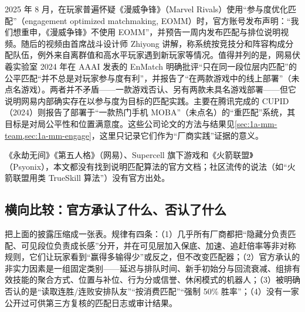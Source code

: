 2025 年 8 月，在玩家普遍怀疑《漫威争锋》（Marvel Rivals）使用“参与度优化匹配”（engagement optimized matchmaking, EOMM）时，官方账号发布声明：“我们想重申，《漫威争锋》不使用 EOMM”，并预告一周内发布匹配与排位说明视频\cite{insidergaming2025rivals}\tagOff。随后的视频由首席战斗设计师 Zhiyong 讲解，称系统按竞技分和阵容构成分配队伍，例外来自离群值和高水平玩家遇到新玩家等情况\cite{sportskeeda2025rivals}\tagCom{}。值得并列的是，网易伏羲实验室 2024 年在 AAAI 发表的 EnMatch 明确批评“只在同一段位层内匹配”的公平匹配“并不总是对玩家参与度有利”，并报告了“在两款游戏中的线上部署”（未点名游戏）\cite{wang2024enmatch}\tagLit。两者并不矛盾——一款游戏否认、另有两款未具名游戏部署——但它说明网易内部确实存在以参与度为目标的匹配实践。主要在腾讯完成的 CUPID（2024）则报告了部署于“一款热门手机 MOBA”（未点名）的“重匹配”系统，其目标是对局公平性和位置满意度\cite{fan2024cupid}\tagLit。这些公司论文的方法与结果见\cref{sec:1a-mm-team,sec:1a-mm-engage}，这里只记录它们作为“厂商实践”证据的意义。

《永劫无间》《第五人格》（网易）、Supercell 旗下游戏和《火箭联盟》（Psyonix），本文都没有找到说明匹配算法的官方文档；社区流传的说法（如“火箭联盟用类 TrueSkill 算法”）没有官方出处。

\subsection{横向比较：官方承认了什么、否认了什么}
\label{sec:ch1b-compare}

把上面的披露压缩成一张表。规律有四条：（1）几乎所有厂商都把“隐藏分负责匹配、可见段位负责成长感”分开，并在可见层加入保底、加速、追赶倍率等非对称规则，它们让玩家看到“赢得多输得少”或反之，但不改变匹配器；（2）官方承认的非实力因素是一组固定类别——延迟与排队时间、新手初始分与回流衰减、组排有效技能的聚合方式、位置与补位、行为分或信誉、休闲模式的机器人；（3）被明确否认的是“读取连胜/连败安排队友”“按消费匹配”“强制 50\% 胜率”；（4）没有一家公开过可供第三方复核的匹配日志或审计结果。

